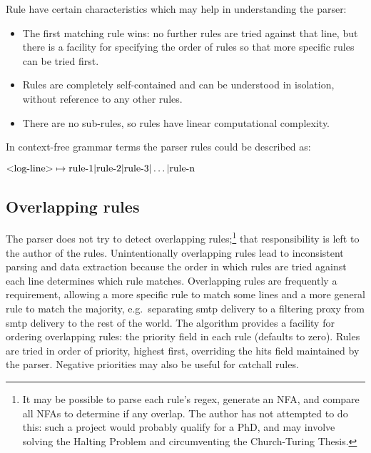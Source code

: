 \documentclass[a4paper,12pt,draft]{article}
\begin{document}
Rule have certain characteristics which may help in understanding the
parser:

\begin{itemize}

    \item The first matching rule wins: no further rules are tried against
        that line, but there is a facility for specifying the order of
        rules so that more specific rules can be tried first.

    \item Rules are completely self-contained and can be understood in
        isolation, without reference to any other rules.

    \item There are no sub-rules, so rules have linear computational
        complexity.

\end{itemize}

\label{comparison against context-free grammars}

In context-free grammar terms the parser rules could be described as:

$\text{\textless{}log-line\textgreater{}} \mapsto \text{rule-1} |
\text{rule-2} | \text{rule-3} | \dots | \text{rule-n}$


\subsection{Overlapping rules}

\label{overlapping rules}

The parser does not try to detect overlapping rules;\footnote{It may be
possible to parse each rule's regex, generate an NFA, and compare all NFAs
to determine if any overlap.  The author has not attempted to do this: such
a project would probably qualify for a PhD, and may involve solving the
Halting Problem and circumventing the Church-Turing Thesis.} that
responsibility is left to the author of the rules.  Unintentionally
overlapping rules lead to inconsistent parsing and data extraction because
the order in which rules are tried against each line determines which rule
matches.  Overlapping rules are frequently a requirement, allowing a more
specific rule to match some lines and a more general rule to match the
majority, e.g.\ separating smtp delivery to a filtering proxy from smtp
delivery to the rest of the world.  The algorithm provides a facility for
ordering overlapping rules: the priority field in each rule (defaults to
zero).  Rules are tried in order of priority, highest first, overriding the
hits field maintained by the parser.  Negative priorities may also be
useful for catchall rules.
\end{document}

